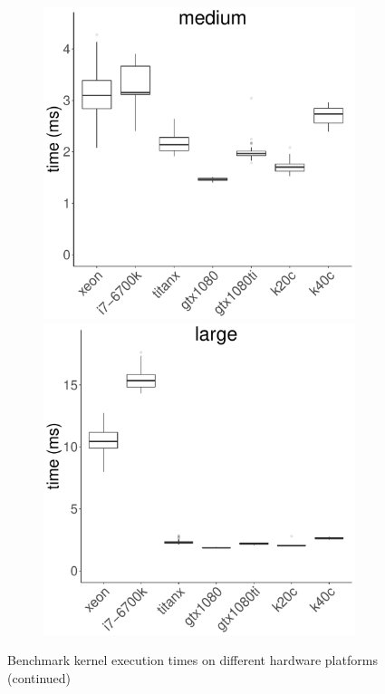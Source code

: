 \documentclass[../document.tex]{subfiles}
\begin{document}
\begin{figure}[t]
\begin{subfigure}{0.9\textwidth}
		\includegraphics[width=\plotwidth]{figures/time-results/generate_srad_medium_boxplot-1}
		\includegraphics[width=\plotwidth]{figures/time-results/generate_srad_large_boxplot-1}
	\end{subfigure}
    \caption{Benchmark kernel execution times on different hardware platforms (continued)}\label{fig:time2}
\end{figure}
\end{document}
